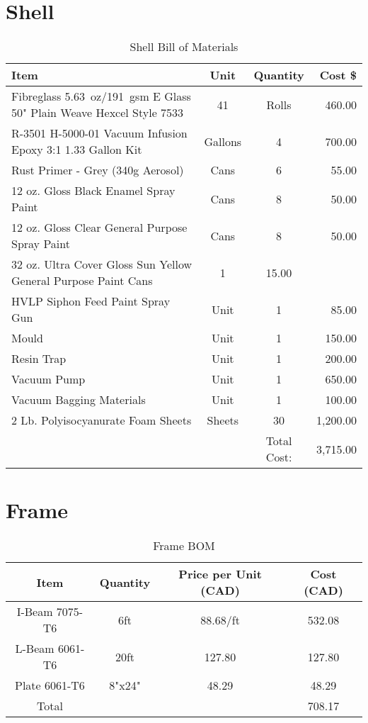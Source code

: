 \documentclass[main.tex]{subfiles}
\begin{document}
\section{Shell}
\begin{table}[H]
\centering
  \begin{tabular}{@{}l c c r@{}} \toprule
    Item & Unit & Quantity & Cost \$ \\ \midrule
    Fibreglass \SI{5.63}{oz}/\SI{191}{gsm} E Glass 50" Plain Weave Hexcel Style 7533 & 41 & Rolls & 460.00 \\
    R-3501 H-5000-01 Vacuum Infusion Epoxy 3:1 1.33 Gallon Kit & Gallons & 4 & 700.00\\
    Rust Primer - Grey (340g Aerosol) & Cans & 6 & 55.00\\
    12 oz. Gloss Black Enamel Spray Paint & Cans & 8 & 50.00\\
    12 oz. Gloss Clear General Purpose Spray Paint & Cans & 8 & 50.00\\
    32 oz. Ultra Cover Gloss Sun Yellow General Purpose Paint Cans & 1 & 15.00\\
    HVLP Siphon Feed Paint Spray Gun & Unit & 1 & 85.00 \\
    Mould & Unit & 1 & 150.00 \\
    Resin Trap & Unit & 1 & 200.00 \\
    Vacuum Pump & Unit & 1 & 650.00 \\
    Vacuum Bagging Materials & Unit & 1 & 100.00 \\
    2 Lb. Polyisocyanurate Foam Sheets & Sheets & 30 & 1,200.00 \\
    \midrule
     & & Total Cost: & 3,715.00\\
     \bottomrule
  \end{tabular}
  \caption{Shell Bill of Materials}
  \label{table:shellmoney}
\end{table}
\section{Frame}
\begin{table}[H]
    \centering
    \begin{tabular}{cccc}

    \toprule

    Item & Quantity & Price per Unit (CAD) & Cost (CAD) \\
    \midrule

    I-Beam 7075-T6 & 6ft & 88.68/ft & 532.08\\
    L-Beam 6061-T6 & 20ft & 127.80 & 127.80\\
    Plate 6061-T6 & 8"x24" & 48.29 & 48.29\\

\midrule
Total & & & 708.17\\
    \bottomrule

	\end{tabular}
    \caption{Frame BOM}
    \label{table:frame-bom}
\end{table}
\end{document}
